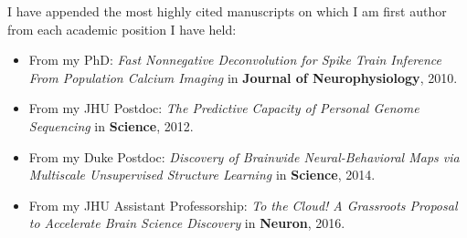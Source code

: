 \documentclass[10pt,colorlinks=true,urlcolor=blue]{moderncv}
\begin{document}
I have appended the most highly cited manuscripts on which I am first author from each academic position I have held:
\begin{itemize}
\item From my PhD: \emph{Fast Nonnegative Deconvolution for Spike Train Inference From Population Calcium Imaging} in \textbf{Journal of Neurophysiology}, 2010.
\item From my JHU Postdoc: \emph{The Predictive Capacity of Personal Genome Sequencing} in \textbf{Science}, 2012.
\item From my Duke Postdoc: \emph{Discovery of Brainwide Neural-Behavioral Maps via Multiscale Unsupervised Structure Learning} in \textbf{Science}, 2014.
\item From my JHU Assistant Professorship: \emph{To the Cloud! A Grassroots Proposal to Accelerate Brain Science Discovery} in \textbf{Neuron}, 2016.
\end{itemize}






\end{document}
